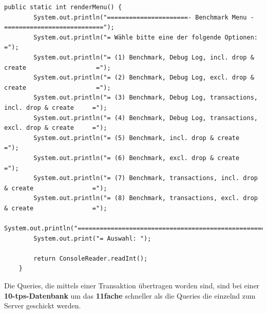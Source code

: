 \begin{lstlisting}[caption={Renderer für das Konsolen Menü}]
	public static int renderMenu() {
		System.out.println("======================- Benchmark Menu -===========================");
		System.out.println("= Wähle bitte eine der folgende Optionen:                         =");
		System.out.println("= (1) Benchmark, Debug Log, incl. drop & create                   =");
		System.out.println("= (2) Benchmark, Debug Log, excl. drop & create                   =");
		System.out.println("= (3) Benchmark, Debug Log, transactions, incl. drop & create     =");
		System.out.println("= (4) Benchmark, Debug Log, transactions, excl. drop & create     =");
		System.out.println("= (5) Benchmark, incl. drop & create                              =");
		System.out.println("= (6) Benchmark, excl. drop & create                              =");
		System.out.println("= (7) Benchmark, transactions, incl. drop & create                =");
		System.out.println("= (8) Benchmark, transactions, excl. drop & create                =");
		System.out.println("===================================================================");
		System.out.print("= Auswahl: ");
		
		return ConsoleReader.readInt();
	}
\end{lstlisting}

 
Die Queries, die mittels einer Transaktion übertragen worden sind, sind bei
einer \textbf{10-tps-Datenbank} um \ca das \textbf{11fache} schneller als die
Queries die einzelnd zum Server geschickt werden.

\begin{figure}[!htbp] 
\end{figure} 

